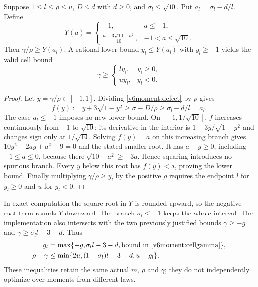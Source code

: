 \begin{lemma}\label{v6moment:inverse}
Suppose $1\le l\le\rho\le u$, $D\le d$ with $d\ge0$, and
$\sigma_l\le\sqrt{10}$. Put $a_l=\sigma_l-d/l$. Define
\[
 Y(a)=
 \begin{cases}
 -1,&a\le-1,\\
 \displaystyle\frac{a-3\sqrt{10-a^2}}{10},&-1<a\le\sqrt{10}.
 \end{cases}
\]
Then $\gamma/\rho\ge Y(a_l)$. A rational lower bound $y_l\le Y(a_l)$
with $y_l\ge-1$ yields the valid cell bound
\begin{equation}\label{v6moment:cellgamma}
 \gamma\ge
 \begin{cases}l y_l,&y_l\ge0,\\u y_l,&y_l<0.\end{cases}
\end{equation}
\end{lemma}
\begin{proof}
Let $y=\gamma/\rho\in[-1,1]$. Dividing
\eqref{v6moment:defect} by $\rho$ gives
\[
 f(y):=y+3\sqrt{1-y^2}\ge\sigma-D/\rho
 \ge\sigma_l-d/l=a_l.
\]
The case $a_l\le-1$ imposes no new lower bound. On
$[-1,1/\sqrt{10}]$, $f$ increases continuously from $-1$ to
$\sqrt{10}$; its derivative in the interior is
$1-3y/\sqrt{1-y^2}$ and changes sign only at $1/\sqrt{10}$.
Solving $f(y)=a$ on this increasing branch gives
$10y^2-2ay+a^2-9=0$ and the stated smaller root.
It has $a-y\ge0$, including $-1\le a\le0$, because there
$\sqrt{10-a^2}\ge-3a$. Hence squaring introduces no spurious branch.
Every $y$ below this root has $f(y)<a$, proving the lower bound.
Finally multiplying $\gamma/\rho\ge y_l$ by the positive $\rho$
requires the endpoint $l$ for $y_l\ge0$ and $u$ for $y_l<0$.
\end{proof}

In exact computation the square root in $Y$ is rounded upward, so the
negative root term rounds $Y$ downward. The branch $a_l\le-1$ keeps
the whole interval. The implementation also intersects with the two
previously justified bounds $\gamma\ge-g$ and
$\gamma\ge\sigma_l l-3-d$. Thus
\begin{align}
 g_l&=\max\{-g,\sigma_l l-3-d,\text{bound in
 \eqref{v6moment:cellgamma}}\},\label{v6moment:gl}\\
 \rho-\gamma&\le
 \min\{2u,(1-\sigma_l)l+3+d,u-g_l\}.
 \label{v6moment:diff}
\end{align}
These inequalities retain the same actual $m$, $\rho$ and $\gamma$;
they do not independently optimize over moments from different laws.
